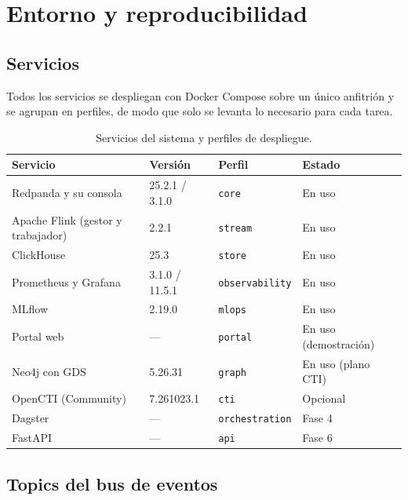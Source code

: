 \chapter{Entorno y reproducibilidad}
\label{anx:reproducibilidad}

\section{Servicios}

Todos los servicios se despliegan con Docker Compose sobre un único anfitrión y se agrupan en
perfiles, de modo que solo se levanta lo necesario para cada tarea.

\begin{table}[H]
\centering
\small
\begin{tabular}{|l|l|l|l|}
\hline
\textbf{Servicio} & \textbf{Versión} & \textbf{Perfil} & \textbf{Estado} \\
\hline
Redpanda y su consola & 25.2.1 / 3.1.0 & \texttt{core} & En uso \\
Apache Flink (gestor y trabajador) & 2.2.1 & \texttt{stream} & En uso \\
ClickHouse & 25.3 & \texttt{store} & En uso \\
Prometheus y Grafana & 3.1.0 / 11.5.1 & \texttt{observability} & En uso \\
MLflow & 2.19.0 & \texttt{mlops} & En uso \\
Portal web & --- & \texttt{portal} & En uso (demostración) \\
Neo4j con GDS & 5.26.31 & \texttt{graph} & En uso (plano CTI) \\
OpenCTI (Community) & 7.261023.1 & \texttt{cti} & Opcional \\
Dagster & --- & \texttt{orchestration} & Fase 4 \\
FastAPI & --- & \texttt{api} & Fase 6 \\
\hline
\end{tabular}
\caption{Servicios del sistema y perfiles de despliegue.}
\label{tab:servicios}
\end{table}

\section{Topics del bus de eventos}

